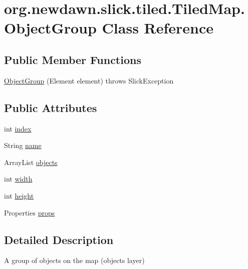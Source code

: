 \hypertarget{classorg_1_1newdawn_1_1slick_1_1tiled_1_1_tiled_map_1_1_object_group}{}\section{org.\+newdawn.\+slick.\+tiled.\+Tiled\+Map.\+Object\+Group Class Reference}
\label{classorg_1_1newdawn_1_1slick_1_1tiled_1_1_tiled_map_1_1_object_group}
\subsection*{Public Member Functions}
\begin{DoxyCompactItemize}
\item 
\mbox{\hyperlink{classorg_1_1newdawn_1_1slick_1_1tiled_1_1_tiled_map_1_1_object_group_a2030b1cef151fcb6a2185e1aa9de571a}{Object\+Group}} (Element element)  throws Slick\+Exception 
\end{DoxyCompactItemize}
\subsection*{Public Attributes}
\begin{DoxyCompactItemize}
\item 
int \mbox{\hyperlink{classorg_1_1newdawn_1_1slick_1_1tiled_1_1_tiled_map_1_1_object_group_a3f12f222fefae365181b2fc1b9a3ec33}{index}}
\item 
String \mbox{\hyperlink{classorg_1_1newdawn_1_1slick_1_1tiled_1_1_tiled_map_1_1_object_group_affd673a1cabc99a8c700de0f82e41ba7}{name}}
\item 
Array\+List \mbox{\hyperlink{classorg_1_1newdawn_1_1slick_1_1tiled_1_1_tiled_map_1_1_object_group_ab11d113b64b9555b7f9e4fb1b2ceccae}{objects}}
\item 
int \mbox{\hyperlink{classorg_1_1newdawn_1_1slick_1_1tiled_1_1_tiled_map_1_1_object_group_a5a09777de1d3208dfd45df20aa97b266}{width}}
\item 
int \mbox{\hyperlink{classorg_1_1newdawn_1_1slick_1_1tiled_1_1_tiled_map_1_1_object_group_a645fa921dd9c7a684e13b513c00072b7}{height}}
\item 
Properties \mbox{\hyperlink{classorg_1_1newdawn_1_1slick_1_1tiled_1_1_tiled_map_1_1_object_group_a601905936bbd5be629c436112c3e86cd}{props}}
\end{DoxyCompactItemize}


\subsection{Detailed Description}
A group of objects on the map (objects layer)

